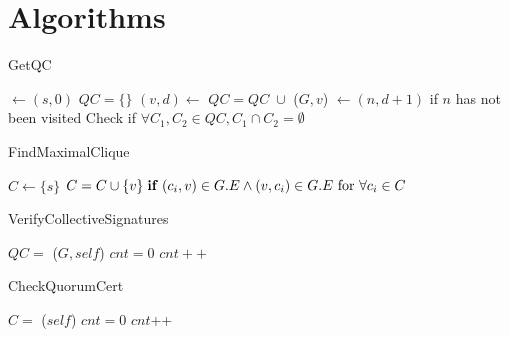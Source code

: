 \section{Algorithms}
%
%
\SetAlCapNameFnt{\sf}

\begin{algorithm}
\label{GetQC}
  \caption{GetQC}
  \queue $\leftarrow {(s, 0)}$\;
  $QC = \{\}$\;
  \Repeat{\queue $= \emptyset$}
  {
    $(v, d) \leftarrow$ \queue\;
    $QC = QC\; \cup$ \FindMaximalClique($G, v$)\;
    {
      \queue $\leftarrow (n, d + 1)$ if $n$ has not been visited\;
    }
  }
  Check if $\forall C_1, C_2 \in QC, C_1 \cap C_2 = \emptyset$\;
\end{algorithm}

\begin{algorithm}
  \caption{FindMaximalClique}
  $C \leftarrow \{s\}$\;
  {
    $C = C \cup \{v\} \;\text{\bf if } (c_i, v) \in G.E \wedge (v, c_i) \in G.E \text{ for } \forall c_i \in C$\;
  }
\end{algorithm}

\begin{algorithm}
\label{VerifyCollectiveSignatures}
  \caption{VerifyCollectiveSignatures}
  $QC = $ \GetQC($G, self$)\;
  {
    $cnt = 0$\;
    {
      {
        $cnt++$\;
      }
    }
    {
    }
  }
\end{algorithm}

\begin{algorithm}
\label{CheckQuorumCert}
  \caption{CheckQuorumCert}
  $C = $ \FindMaximalClique($self$)\;
  $cnt = 0$\;
  {
    {
      $cnt$++\;
    }
  }
\end{algorithm}

